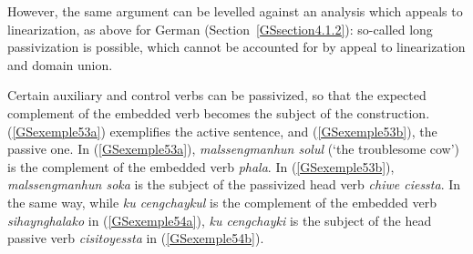 \documentclass[output=paper
                ,modfonts
                ,nonflat
	        ,collection
	        ,collectionchapter
	        ,collectiontoclongg
 	        ,biblatex
                ,babelshorthands
                ,newtxmath
                ,draftmode
                ,colorlinks, citecolor=brown
]{./langsci/langscibook}
\begin{document}
{\begin{exe}
    \label{GSexemple52}
\end{exe}

However, the same argument can be levelled against an analysis which appeals to linearization, as above for German (Section~\ref{GSsection4.1.2}): so-called long passivization is possible, which cannot be accounted for by appeal to linearization and domain union.

Certain auxiliary and control verbs can be passivized, so that the expected complement of the embedded verb becomes the subject of the construction. (\ref{GSexemple53a}) exemplifies the active sentence, and (\ref{GSexemple53b}), the passive one. In (\ref{GSexemple53a}), \textit{malssengmanhun solul} (`the troublesome cow’) is the complement of the embedded verb \textit{phala}. In (\ref{GSexemple53b}), \textit{malssengmanhun soka} is the subject of the passivized head verb \textit{chiwe ciessta}. In the same way, while \textit{ku cengchaykul} is the complement of the embedded verb \textit{sihaynghalako} in (\ref{GSexemple54a}), \textit{ku cengchayki} is the subject of the head passive verb \textit{cisitoyessta} in (\ref{GSexemple54b}).  

\begin{exe}
	\ex \label{GSexemple53} 
	\begin{xlist}
        \label{GSexemple53a}
		

\end{xlist}
\end{exe}}
\end{document}
